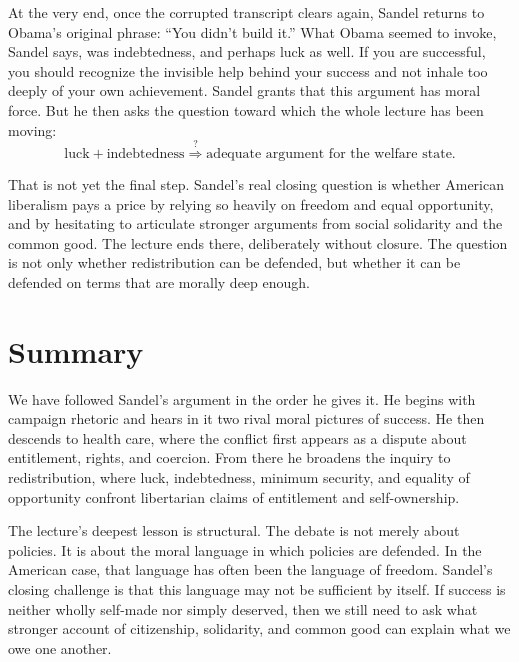 At the very end, once the corrupted transcript clears again, Sandel returns to Obama's original phrase: ``You didn't build it.'' What Obama seemed to invoke, Sandel says, was indebtedness, and perhaps luck as well. If you are successful, you should recognize the invisible help behind your success and not inhale too deeply of your own achievement. Sandel grants that this argument has moral force. But he then asks the question toward which the whole lecture has been moving:
\begin{equation}
\text{luck} + \text{indebtedness}
\stackrel{?}{\Longrightarrow}
\text{adequate argument for the welfare state}.
\end{equation}

That is not yet the final step. Sandel's real closing question is whether American liberalism pays a price by relying so heavily on freedom and equal opportunity, and by hesitating to articulate stronger arguments from social solidarity and the common good. The lecture ends there, deliberately without closure. The question is not only whether redistribution can be defended, but whether it can be defended on terms that are morally deep enough.

\section{Summary}

We have followed Sandel's argument in the order he gives it. He begins with campaign rhetoric and hears in it two rival moral pictures of success. He then descends to health care, where the conflict first appears as a dispute about entitlement, rights, and coercion. From there he broadens the inquiry to redistribution, where luck, indebtedness, minimum security, and equality of opportunity confront libertarian claims of entitlement and self-ownership.

The lecture's deepest lesson is structural. The debate is not merely about policies. It is about the moral language in which policies are defended. In the American case, that language has often been the language of freedom. Sandel's closing challenge is that this language may not be sufficient by itself. If success is neither wholly self-made nor simply deserved, then we still need to ask what stronger account of citizenship, solidarity, and common good can explain what we owe one another.